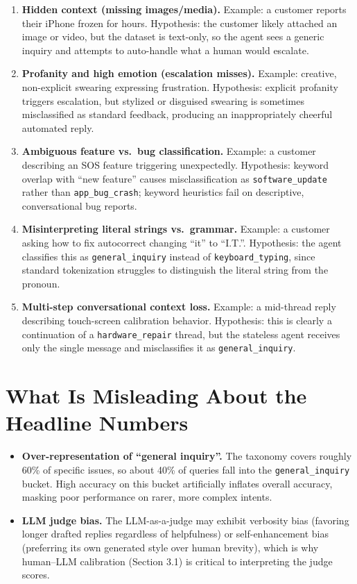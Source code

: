 \documentclass[11pt]{article}
\begin{document}
\begin{enumerate}
  \item \textbf{Hidden context (missing images/media).} Example: a customer reports their iPhone frozen for hours. Hypothesis: the customer likely attached an image or video, but the dataset is text-only, so the agent sees a generic inquiry and attempts to auto-handle what a human would escalate.
  \item \textbf{Profanity and high emotion (escalation misses).} Example: creative, non-explicit swearing expressing frustration. Hypothesis: explicit profanity triggers escalation, but stylized or disguised swearing is sometimes misclassified as standard feedback, producing an inappropriately cheerful automated reply.
  \item \textbf{Ambiguous feature vs.\ bug classification.} Example: a customer describing an SOS feature triggering unexpectedly. Hypothesis: keyword overlap with ``new feature'' causes misclassification as \texttt{software\_update} rather than \texttt{app\_bug\_crash}; keyword heuristics fail on descriptive, conversational bug reports.
  \item \textbf{Misinterpreting literal strings vs.\ grammar.} Example: a customer asking how to fix autocorrect changing ``it'' to ``I.T.''. Hypothesis: the agent classifies this as \texttt{general\_inquiry} instead of \texttt{keyboard\_typing}, since standard tokenization struggles to distinguish the literal string from the pronoun.
  \item \textbf{Multi-step conversational context loss.} Example: a mid-thread reply describing touch-screen calibration behavior. Hypothesis: this is clearly a continuation of a \texttt{hardware\_repair} thread, but the stateless agent receives only the single message and misclassifies it as \texttt{general\_inquiry}.
\end{enumerate}

\section{What Is Misleading About the Headline Numbers}

\begin{itemize}
  \item \textbf{Over-representation of ``general inquiry''.} The taxonomy covers roughly 60\% of specific issues, so about 40\% of queries fall into the \texttt{general\_inquiry} bucket. High accuracy on this bucket artificially inflates overall accuracy, masking poor performance on rarer, more complex intents.
  \item \textbf{LLM judge bias.} The LLM-as-a-judge may exhibit verbosity bias (favoring longer drafted replies regardless of helpfulness) or self-enhancement bias (preferring its own generated style over human brevity), which is why human--LLM calibration (Section 3.1) is critical to interpreting the judge scores.
\end{itemize}
\end{document}
